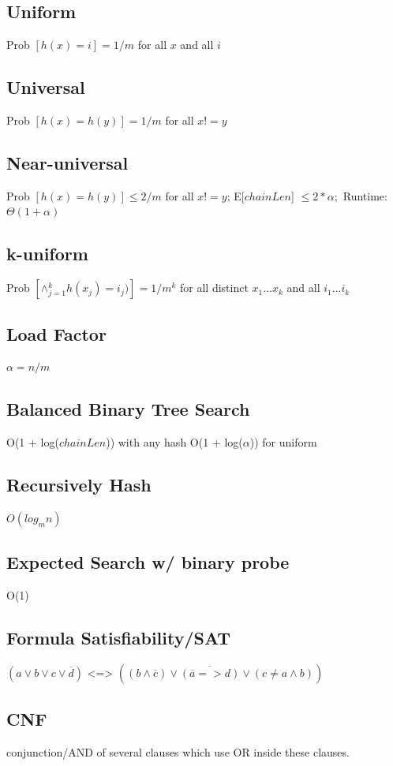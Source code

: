 
\subsection{Uniform}

Prob $[h(x) = i] = 1/m$ for all $x$ and all $i$

\subsection{Universal}
Prob $[h(x) = h(y)] = 1/m$ for all $x != y$
\subsection{Near-universal}
Prob $[h(x) = h(y)] \leq 2/m$ for all $x != y$; E[$chainLen$] $\leq 2*\alpha;$ Runtime: $\Theta(1 + \alpha)$
\subsection{k-uniform}
Prob $ [ \wedge{}_{j=1}^{k} h(x_j) = i_j) ] = 1 / m^{k}$ for all distinct $x_1...x_k$ and all $i_1...i_k$
\subsection{Load Factor}
$\alpha = n/m$
\subsection{Balanced Binary Tree Search}
O(1 + log($chainLen$)) with any hash 
O(1 + log($\alpha$)) for uniform
\subsection{Recursively Hash}
$O(log_{m}{n})$
\subsection{Expected Search w/ binary probe}
O(1)


\subsection{Formula Satisfiability/SAT}
$(a \vee b \vee c \vee \overbar{d})$ <=>  $((b \wedge \overbar{c}) \vee \overbar{ ( \overbar{a} => d) } \vee (c \neq a \wedge b)) $

\subsection{CNF}
conjunction/AND of several clauses which use OR inside these clauses.
